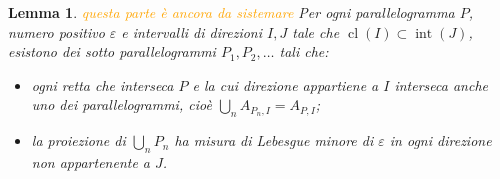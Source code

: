 \documentclass[a4paper, twoside,openright]{article}
\newcommand{\<}{\langle}
\renewcommand{\>}{\rangle}
\newtheorem{lemma}[teo]{Lemma}
\begin{document}
\begin{lemma} \label{lemmabrutto}
	\textcolor{orange}{questa parte è ancora da sistemare}
Per ogni parallelogramma $P$, numero positivo $\varepsilon$ e intervalli di direzioni $I, J$ tale che $\operatorname{cl}(I) \subset \operatorname{int}(J)$, esistono dei sotto parallelogrammi $P_{1}, P_{2}, \ldots$ tali che:
\begin{itemize}
	\item ogni retta che interseca $P$ e la cui direzione appartiene a $I$ interseca anche uno dei parallelogrammi, cioè $\bigcup_{n} A_{P_{n}, I}=A_{P, I}$;
	\item la proiezione di $\bigcup_{n} P_{n}$ ha misura di Lebesgue minore di $\varepsilon$ in ogni direzione non appartenente a $J$.
\end{itemize}
\end{lemma}
\end{document}
